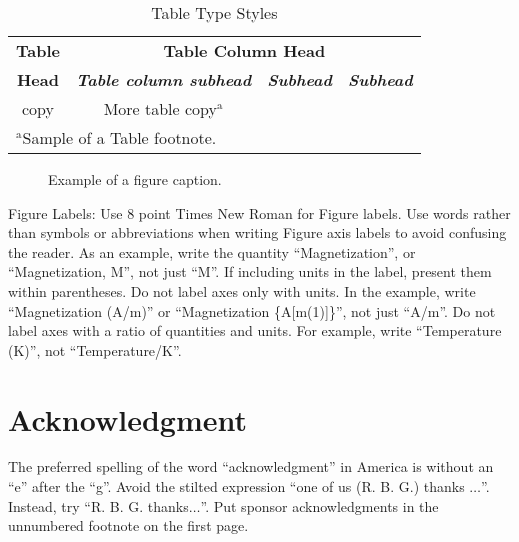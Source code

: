 \documentclass[conference]{IEEEtran}
\begin{document}
    \begin{table}[htbp]
        \caption{Table Type Styles}
        \begin{center}
            \begin{tabular}{|c|c|c|c|}
                \hline
                \textbf{Table} & \multicolumn{3}{|c|}{\textbf{Table Column Head}} \\
                \cline{2-4}
                \textbf{Head} & \textbf{\textit{Table column subhead}} & \textbf{\textit{Subhead}} & \textbf{\textit{Subhead}} \\
                \hline
                copy          & More table copy$^{\mathrm{a}}$         &                           &                           \\
                \hline
                \multicolumn{4}{l}{$^{\mathrm{a}}$Sample of a Table footnote.}
            \end{tabular}
            \label{tab1}
        \end{center}
    \end{table}

    \begin{figure}[htbp]
        \caption{Example of a figure caption.}
        \label{fig}
    \end{figure}

    Figure Labels: Use 8 point Times New Roman for Figure labels. Use words
    rather than symbols or abbreviations when writing Figure axis labels to
    avoid confusing the reader. As an example, write the quantity
    ``Magnetization'', or ``Magnetization, M'', not just ``M''. If including
    units in the label, present them within parentheses. Do not label axes only
    with units. In the example, write ``Magnetization (A/m)'' or ``Magnetization
    \{A[m(1)]\}'', not just ``A/m''. Do not label axes with a ratio of
    quantities and units. For example, write ``Temperature (K)'', not
    ``Temperature/K''.

    \section*{Acknowledgment}

    The preferred spelling of the word ``acknowledgment'' in America is without
    an ``e'' after the ``g''. Avoid the stilted expression ``one of us (R. B.
    G.) thanks $\ldots$''. Instead, try ``R. B. G. thanks$\ldots$''. Put sponsor
    acknowledgments in the unnumbered footnote on the first page.
\end{document}
